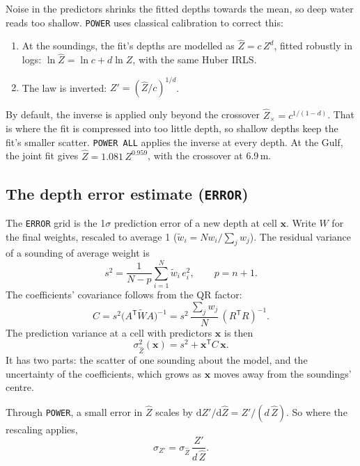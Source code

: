 \documentclass[11pt]{article}
\numberwithin{equation}{section}
\newcommand{\bx}{\mathbf{x}}
\newcommand{\code}[1]{\texttt{#1}}
\begin{document}
Noise in the predictors shrinks the fitted depths towards the mean, so deep water reads too
shallow. \code{POWER} uses classical calibration to correct this:
\begin{enumerate}
\item At the soundings, the fit's depths are modelled as $\hat Z = c\,Z^{d}$, fitted robustly in
  logs: $\ln \hat Z = \ln c + d \ln Z$, with the same Huber IRLS.
\item The law is inverted: $Z' = (\hat Z/c)^{1/d}$.
\end{enumerate}
By default, the inverse is applied only beyond the crossover $\hat Z_\times = c^{1/(1-d)}$. That is
where the fit is compressed into too little depth, so shallow depths keep the fit's smaller
scatter. \code{POWER ALL} applies the inverse at every depth. At the Gulf, the joint fit gives
$\hat Z = 1.081\,Z^{0.959}$, with the crossover at 6.9\,m.

\subsection{The depth error estimate (\code{ERROR})}
\label{sec:lyz_error}

The \code{ERROR} grid is the 1$\sigma$ prediction error of a new depth at cell $\bx$. Write $W$
for the final weights, rescaled to average 1 ($\tilde w_i = N w_i / \sum_j w_j$). The residual
variance of a sounding of average weight is
\begin{equation}
  s^2 = \frac{1}{N - p}\sum_{i=1}^{N} \tilde w_i\, e_i^2 , \qquad p = n + 1 .
  \label{eq:s2}
\end{equation}
The coefficients' covariance follows from the QR factor:
\begin{equation}
  C = s^2 \bigl(A^{\mathsf T}\tilde W A\bigr)^{-1} = s^2\,\frac{\sum_j w_j}{N}\,(R^{\mathsf T}R)^{-1}.
\end{equation}
The prediction variance at a cell with predictors $\mathbf{x}$ is then
\begin{equation}
  \sigma_{\hat Z}^2(\bx) = s^2 + \mathbf{x}^{\mathsf T} C\, \mathbf{x} .
  \label{eq:pred_var}
\end{equation}
It has two parts: the scatter of one sounding about the model, and the uncertainty of the
coefficients, which grows as $\mathbf{x}$ moves away from the soundings' centre.

Through \code{POWER}, a small error in $\hat Z$ scales by $\mathrm{d}Z'/\mathrm{d}\hat Z =
Z'/(d\,\hat Z)$. So where the rescaling applies,
\begin{equation}
  \sigma_{Z'} = \sigma_{\hat Z}\, \frac{Z'}{d\,\hat Z} .
\end{equation}
\end{document}
